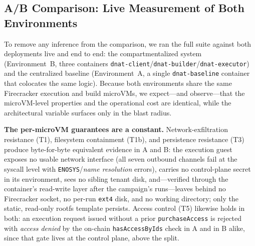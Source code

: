 
\subsection{A/B Comparison: Live Measurement of Both Environments}
\label{sec:ab-results}

To remove any inference from the comparison, we ran the full suite against both
deployments live and end to end: the compartmentalized system (Environment~B,
three containers \texttt{dnat-client}/\texttt{dnat-builder}/\texttt{dnat-executor})
and the centralized baseline (Environment~A, a single \texttt{dnat-baseline}
container that colocates the same logic). Because both environments share the same
Firecracker execution and build microVMs, we expect---and observe---that the
microVM-level properties and the operational cost are identical, while the
architectural variable surfaces only in the blast radius.

\textbf{The per-microVM guarantees are a constant.} Network-exfiltration
resistance (T1), filesystem containment (T1b), and persistence resistance (T3)
produce byte-for-byte equivalent evidence in A and B: the execution guest exposes
no usable network interface (all seven outbound channels fail at the syscall level
with \texttt{ENOSYS}/\emph{name resolution} errors), carries no control-plane
secret in its environment, sees no sibling tenant disk, and---verified through the
container's read-write layer after the campaign's runs---leaves behind no
Firecracker socket, no per-run \texttt{ext4} disk, and no working directory; only
the static, read-only rootfs template persists. Access control (T5) likewise holds
in both: an execution request issued without a prior \texttt{purchaseAccess} is
rejected with \emph{access denied} by the on-chain \texttt{hasAccessByIds} check in
A and in B alike, since that gate lives at the control plane, above the split.


